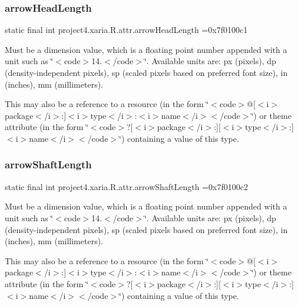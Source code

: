 \subsubsection{\texorpdfstring{arrow\+Head\+Length}{arrowHeadLength}}
{\footnotesize\ttfamily static final int project4.\+xaria.\+R.\+attr.\+arrow\+Head\+Length =0x7f0100c1\hspace{0.3cm}{\ttfamily [static]}}

Must be a dimension value, which is a floating point number appended with a unit such as \char`\"{}$<$code$>$14.\+5sp$<$/code$>$\char`\"{}. Available units are\+: px (pixels), dp (density-\/independent pixels), sp (scaled pixels based on preferred font size), in (inches), mm (millimeters). 

This may also be a reference to a resource (in the form \char`\"{}$<$code$>$@\mbox{[}$<$i$>$package$<$/i$>$\+:\mbox{]}$<$i$>$type$<$/i$>$\+:$<$i$>$name$<$/i$>$$<$/code$>$\char`\"{}) or theme attribute (in the form \char`\"{}$<$code$>$?\mbox{[}$<$i$>$package$<$/i$>$\+:\mbox{]}\mbox{[}$<$i$>$type$<$/i$>$\+:\mbox{]}$<$i$>$name$<$/i$>$$<$/code$>$\char`\"{}) containing a value of this type. \mbox{\label{classproject4_1_1xaria_1_1R_1_1attr_a3f9b21113512340bb29a60b45088efb6}} 
\subsubsection{\texorpdfstring{arrow\+Shaft\+Length}{arrowShaftLength}}
{\footnotesize\ttfamily static final int project4.\+xaria.\+R.\+attr.\+arrow\+Shaft\+Length =0x7f0100c2\hspace{0.3cm}{\ttfamily [static]}}

Must be a dimension value, which is a floating point number appended with a unit such as \char`\"{}$<$code$>$14.\+5sp$<$/code$>$\char`\"{}. Available units are\+: px (pixels), dp (density-\/independent pixels), sp (scaled pixels based on preferred font size), in (inches), mm (millimeters). 

This may also be a reference to a resource (in the form \char`\"{}$<$code$>$@\mbox{[}$<$i$>$package$<$/i$>$\+:\mbox{]}$<$i$>$type$<$/i$>$\+:$<$i$>$name$<$/i$>$$<$/code$>$\char`\"{}) or theme attribute (in the form \char`\"{}$<$code$>$?\mbox{[}$<$i$>$package$<$/i$>$\+:\mbox{]}\mbox{[}$<$i$>$type$<$/i$>$\+:\mbox{]}$<$i$>$name$<$/i$>$$<$/code$>$\char`\"{}) containing a value of this type. \mbox{\label{classproject4_1_1xaria_1_1R_1_1attr_a5e3ba4c5b79f55478820c97dd8a72ea7}} 
